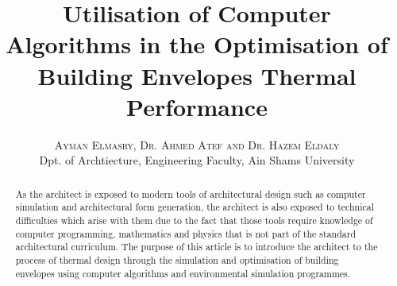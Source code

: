 \documentclass[11pt,a4paper,oneside]{article}
\title{\vspace{-15mm}%
	\Large \textbf{Utilisation of Computer Algorithms in the Optimisation of Building Envelopes Thermal Performance}}
\author{%
	\textsc{Ayman Elmasry, Dr. Ahmed Atef and Dr. Hazem Eldaly}\\
	\normalsize Dpt. of Archtiecture, Engineering Faculty, Ain Shams University
	}
\date{}
\begin{document}
\maketitle

\begin{abstract}
\noindent As the architect is exposed to modern tools of architectural design such as computer simulation and architectural form generation, the architect is also exposed to technical difficulties which arise with them due to the fact that those tools require knowledge of computer programming, mathematics and physics that is not part of the standard architectural curriculum. The purpose of this article is to introduce the architect to the process of thermal design through the simulation and optimisation of building envelopes using computer algorithms and environmental simulation programmes.
\end{abstract}
\end{document}
